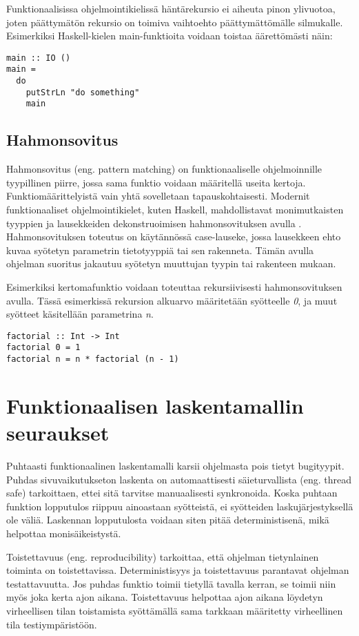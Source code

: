 Funktionaalisissa ohjelmointikielissä häntärekursio ei aiheuta pinon ylivuotoa, joten päättymätön rekursio on toimiva
vaihtoehto päättymättömälle silmukalle. Esimerkiksi Haskell-kielen main-funktioita voidaan toistaa äärettömästi näin:
\begin{verbatim}
main :: IO ()
main =
  do
    putStrLn "do something"
    main
\end{verbatim}

\subsection{Hahmonsovitus}
Hahmonsovitus (eng. pattern matching) on funktionaaliselle ohjelmoinnille tyypillinen piirre, jossa sama funktio voidaan
määritellä useita kertoja. Funktiomäärittelyistä vain yhtä sovelletaan tapauskohtaisesti. Modernit funktionaaliset
ohjelmointikielet, kuten Haskell, mahdollistavat monimutkaisten tyyppien ja lausekkeiden dekonstruoimisen
hahmonsovituksen avulla \cite{learnhaskell}. Hahmonsovituksen toteutus on käytännössä case-lauseke, jossa lausekkeen
ehto kuvaa syötetyn parametrin tietotyyppiä tai sen rakenneta. Tämän avulla ohjelman suoritus jakautuu syötetyn
muuttujan tyypin tai rakenteen mukaan.
\cite{hudak}

Esimerkiksi kertomafunktio voidaan toteuttaa rekursiivisesti hahmonsovituksen avulla. Tässä esimerkissä rekursion
alkuarvo määritetään syötteelle \textit{0}, ja muut syötteet käsitellään parametrina \textit{n}.
\begin{verbatim}
factorial :: Int -> Int
factorial 0 = 1
factorial n = n * factorial (n - 1)
\end{verbatim}

\section{Funktionaalisen laskentamallin seuraukset}
Puhtaasti funktionaalinen laskentamalli karsii ohjelmasta pois tietyt bugityypit. Puhdas sivuvaikutukseton laskenta on
automaattisesti säieturvallista (eng. thread safe) tarkoittaen, ettei sitä tarvitse manuaalisesti synkronoida. Koska
puhtaan funktion lopputulos riippuu ainoastaan syötteistä, ei syötteiden laskujärjestyksellä ole väliä. Laskennan
lopputulosta voidaan siten pitää deterministisenä, mikä helpottaa monisäikeistystä.

Toistettavuus (eng. reproducibility) tarkoittaa, että ohjelman tietynlainen toiminta on toistettavissa. Deterministisyys
ja toistettavuus parantavat ohjelman testattavuutta. Jos puhdas funktio toimii tietyllä tavalla kerran, se toimii niin
myös joka kerta ajon aikana. Toistettavuus helpottaa ajon aikana löydetyn virheellisen tilan toistamista syöttämällä
sama tarkkaan määritetty virheellinen tila testiympäristöön. \cite{functionaljava}

